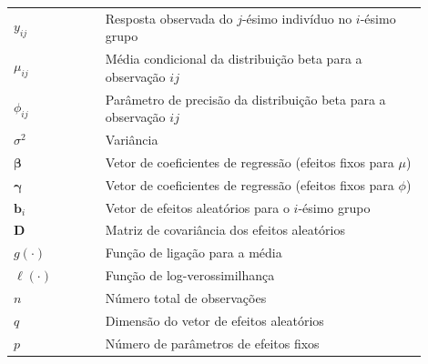 
\begin{listasimb}

\begin{longtable}[l]{p{0.2\linewidth}p{0.7\linewidth}}
$y_{ij}$       & Resposta observada do $j$-ésimo indivíduo no $i$-ésimo grupo\\
$\mu_{ij}$     & Média condicional da distribuição beta para a observação $ij$\\
$\phi_{ij}$    & Parâmetro de precisão da distribuição beta para a observação $ij$\\
$\sigma^2$     & Variância\\
$\bm{\beta}$   & Vetor de coeficientes de regressão (efeitos fixos para $\mu$)\\
$\bm{\gamma}$  & Vetor de coeficientes de regressão (efeitos fixos para $\phi$)\\
$\bm{b}_i$     & Vetor de efeitos aleatórios para o $i$-ésimo grupo\\
$\bm{D}$       & Matriz de covariância dos efeitos aleatórios\\
$g(\cdot)$     & Função de ligação para a média\\
$\ell(\cdot)$  & Função de log-verossimilhança\\
$n$            & Número total de observações\\
$q$            & Dimensão do vetor de efeitos aleatórios\\
$p$            & Número de parâmetros de efeitos fixos\\
\end{longtable}

\end{listasimb}
